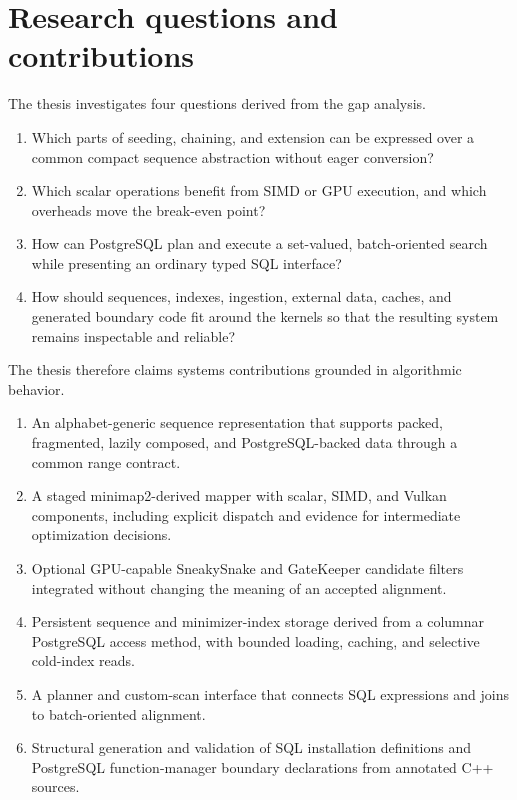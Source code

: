 \section{Research questions and contributions}
\label{sec:solution-gap-questions}

The thesis investigates four questions derived from the gap analysis.

\begin{enumerate}
  \item[\textbf{RQ1.}] Which parts of seeding, chaining, and extension can be expressed
  over a common compact sequence abstraction without eager conversion?

  \item[\textbf{RQ2.}] Which scalar operations benefit from SIMD or GPU execution,
  and which overheads move the break-even point?

  \item[\textbf{RQ3.}] How can PostgreSQL plan and execute a set-valued,
  batch-oriented search while presenting an ordinary typed SQL
  interface?

  \item[\textbf{RQ4.}] How should sequences, indexes, ingestion, external data,
  caches, and generated boundary code fit around the kernels so
  that the resulting system remains inspectable and reliable?
\end{enumerate}

The thesis therefore claims systems contributions grounded in algorithmic
behavior.

\begin{enumerate}
  \item[\textbf{C1.}] An alphabet-generic sequence representation that supports
  packed, fragmented, lazily composed, and PostgreSQL-backed data
  through a common range contract.

  \item[\textbf{C2.}] A staged minimap2-derived mapper with scalar, SIMD, and
  Vulkan components, including explicit dispatch and evidence for
  intermediate optimization decisions.

  \item[\textbf{C3.}] Optional GPU-capable SneakySnake and GateKeeper candidate
  filters integrated without changing the meaning of an accepted
  alignment.

  \item[\textbf{C4.}] Persistent sequence and minimizer-index storage derived from
  a columnar PostgreSQL access method, with bounded loading,
  caching, and selective cold-index reads.

  \item[\textbf{C5.}] A planner and custom-scan interface that connects SQL
  expressions and joins to batch-oriented alignment.

  \item[\textbf{C6.}] Structural generation and validation of SQL installation
  definitions and PostgreSQL function-manager boundary declarations
  from annotated C++ sources.
\end{enumerate}

